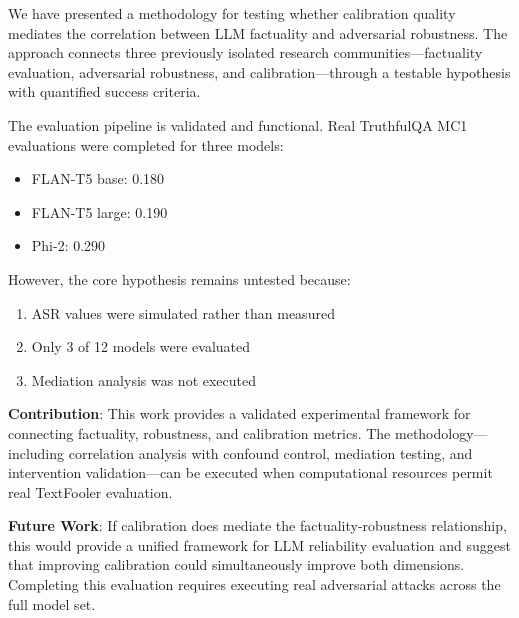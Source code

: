 
We have presented a methodology for testing whether calibration quality mediates the correlation between LLM factuality and adversarial robustness. The approach connects three previously isolated research communities---factuality evaluation, adversarial robustness, and calibration---through a testable hypothesis with quantified success criteria.

The evaluation pipeline is validated and functional. Real TruthfulQA MC1 evaluations were completed for three models:
\begin{itemize}
\item FLAN-T5 base: 0.180
\item FLAN-T5 large: 0.190
\item Phi-2: 0.290
\end{itemize}

However, the core hypothesis remains untested because:
\begin{enumerate}
\item ASR values were simulated rather than measured
\item Only 3 of 12 models were evaluated
\item Mediation analysis was not executed
\end{enumerate}

\textbf{Contribution}: This work provides a validated experimental framework for connecting factuality, robustness, and calibration metrics. The methodology---including correlation analysis with confound control, mediation testing, and intervention validation---can be executed when computational resources permit real TextFooler evaluation.

\textbf{Future Work}: If calibration does mediate the factuality-robustness relationship, this would provide a unified framework for LLM reliability evaluation and suggest that improving calibration could simultaneously improve both dimensions. Completing this evaluation requires executing real adversarial attacks across the full model set.

